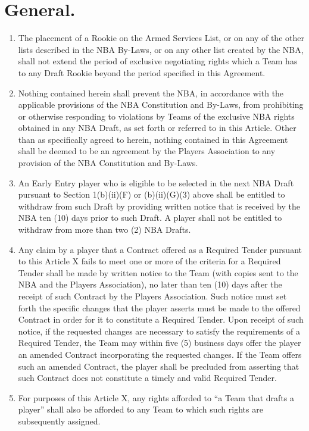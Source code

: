 \documentclass[
]{book}
\providecommand{\tightlist}{%
  \setlength{\itemsep}{0pt}\setlength{\parskip}{0pt}}
\begin{document}
\hypertarget{general.-2}{%
\section{General.}\label{general.-2}}

\begin{enumerate}
\def\labelenumi{(\alph{enumi})}
\tightlist
\item
  The placement of a Rookie on the Armed Services List, or on any of the other lists described in the NBA By-Laws, or on any other list created by the NBA, shall not extend the period of exclusive negotiating rights which a Team has to any Draft Rookie beyond the
  period specified in this Agreement.
\item
  Nothing contained herein shall prevent the NBA, in accordance with the applicable provisions of the NBA Constitution and By-Laws, from prohibiting or otherwise responding to violations by Teams of the exclusive NBA rights obtained in any NBA Draft, as set forth or referred to in this Article. Other than as specifically agreed to herein, nothing contained in this Agreement shall be deemed to be an agreement by the Players Association to any provision of the NBA Constitution and By-Laws.
\item
  An Early Entry player who is eligible to be selected in the next NBA Draft pursuant to Section 1(b)(ii)(F) or (b)(ii)(G)(3) above shall be entitled to withdraw from such Draft by providing written notice that is received by the NBA ten (10) days prior to such Draft. A player shall not be entitled to withdraw from more than two (2) NBA Drafts.
\item
  Any claim by a player that a Contract offered as a Required Tender pursuant to this Article X fails to meet one or more of the criteria for a Required Tender shall be made by written notice to the Team (with copies sent to the NBA and the Players Association), no later than ten (10) days after the receipt of such Contract by the Players Association. Such notice must set forth the specific changes that the player asserts must be made to the offered Contract in order for it to constitute a Required Tender. Upon receipt of such notice, if the requested changes are necessary to satisfy the requirements of a Required Tender, the Team may within five (5) business days offer the player an amended Contract incorporating the requested changes. If the Team offers such an amended Contract, the player shall be precluded from asserting that such Contract does not constitute a timely and valid Required Tender.
\item
  For purposes of this Article X, any rights afforded to ``a Team that drafts a player'' shall also be afforded to any Team to which such rights are subsequently assigned.
\end{enumerate}
\end{document}
